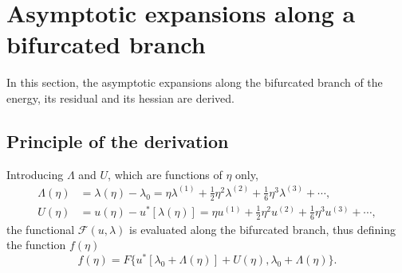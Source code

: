 \documentclass[12pt, final]{scrartcl}
\theoremstyle{definition}
\newcommand{\order}[2][1]{#2^{(#1)}}
\begin{document}
\section{Asymptotic expansions along a bifurcated branch}
\label{sec:20220905060440}

In this section, the asymptotic expansions along the bifurcated branch of the energy, its residual and its hessian are
derived.

\subsection{Principle of the derivation}
\label{sec:20220107121442}
%

Introducing $\Lambda$ and $U$, which are functions of $\eta$ only,
\begin{align}
  \label{eq:20211112155446}
  \Lambda(\eta) & = \lambda(\eta) - \lambda_0 = \eta \order[1]\lambda + \tfrac{1}{2} \eta^2 \order[2]\lambda + \tfrac{1}{6} \eta^3 \order[3]\lambda + \cdots,\\
  \label{eq:20211112113028}
  U(\eta) & = u(\eta) - u^{\ast}[\lambda(\eta)] = \eta \order[1]u + \tfrac{1}{2} \eta^2 \order[2]u + \tfrac{1}{6} \eta^3 \order[3]u + \cdots,
\end{align}
the functional $\mathcal{F}(u, \lambda)$ is evaluated along the bifurcated branch, thus defining the function $f(\eta)$
\begin{equation*}
  f(\eta) = F\{ u^{\ast} [\lambda_0 + \Lambda(\eta)] + U(\eta), \lambda_0 + \Lambda(\eta) \}.
\end{equation*}
\end{document}

